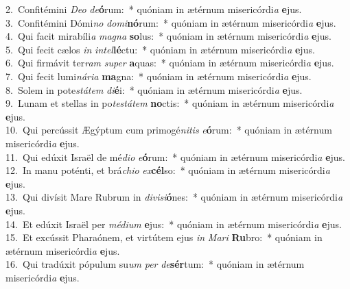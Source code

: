 {2.~}Confitémini \textit{De}\textit{o} \textit{de}\textbf{ó}rum:~* quóniam in ætérnum misericórdi\textit{a} \textbf{e}jus.\\
{3.~}Confitémini Dómi\textit{no} \textit{do}\textit{mi}\textbf{nó}rum:~* quóniam in ætérnum misericórdi\textit{a} \textbf{e}jus.\\
{4.~}Qui facit mirabíli\textit{a} \textit{ma}\textit{gna} \textbf{so}lus:~* quóniam in ætérnum misericórdi\textit{a} \textbf{e}jus.\\
{5.~}Qui fecit cælos \textit{in} \textit{in}\textit{tel}\textbf{lé}ctu:~* quóniam in ætérnum misericórdi\textit{a} \textbf{e}jus.\\
{6.~}Qui firmávit ter\textit{ram} \textit{su}\textit{per} \textbf{a}quas:~* quóniam in ætérnum misericórdi\textit{a} \textbf{e}jus.\\
{7.~}Qui fecit lumi\textit{ná}\textit{ri}\textit{a} \textbf{ma}gna:~* quóniam in ætérnum misericórdi\textit{a} \textbf{e}jus.\\
{8.~}Solem in pote\textit{stá}\textit{tem} \textit{di}\textbf{é}i:~* quóniam in ætérnum misericórdi\textit{a} \textbf{e}jus.\\
{9.~}Lunam et stellas in po\textit{te}\textit{stá}\textit{tem} \textbf{no}ctis:~* quóniam in ætérnum misericórdi\textit{a} \textbf{e}jus.\\
{10.~}Qui percússit Ægýptum cum primogé\textit{ni}\textit{tis} \textit{e}\textbf{ó}rum:~* quóniam in ætérnum misericórdi\textit{a} \textbf{e}jus.\\
{11.~}Qui edúxit Israël de mé\textit{di}\textit{o} \textit{e}\textbf{ó}rum:~* quóniam in ætérnum misericórdi\textit{a} \textbf{e}jus.\\
{12.~}In manu poténti, et brá\textit{chi}\textit{o} \textit{ex}\textbf{cél}so:~* quóniam in ætérnum misericórdi\textit{a} \textbf{e}jus.\\
{13.~}Qui divísit Mare Rubrum in \textit{di}\textit{vi}\textit{si}\textbf{ó}nes:~* quóniam in ætérnum misericórdi\textit{a} \textbf{e}jus.\\
{14.~}Et edúxit Israël per \textit{mé}\textit{di}\textit{um} \textbf{e}jus:~* quóniam in ætérnum misericórdi\textit{a} \textbf{e}jus.\\
{15.~}Et excússit Pharaónem, et virtútem ejus \textit{in} \textit{Ma}\textit{ri} \textbf{Ru}bro:~* quóniam in ætérnum misericórdi\textit{a} \textbf{e}jus.\\
{16.~}Qui tradúxit pópulum su\textit{um} \textit{per} \textit{de}\textbf{sér}tum:~* quóniam in ætérnum misericórdi\textit{a} \textbf{e}jus.\\
